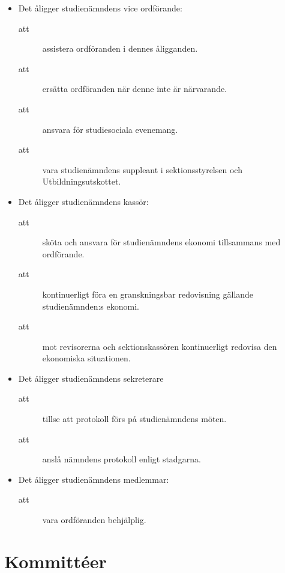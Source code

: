 \documentclass[11pt,a4paper]{article}
\begin{document}
\begin{itemize}
  \item Det åligger studienämndens vice ordförande:
    \begin{description}
      \item[att] assistera ordföranden i dennes åligganden.
      \item[att] ersätta ordföranden när denne inte är närvarande.
      \item[att] ansvara för studiesociala evenemang.
      \item[att] vara studienämndens suppleant i sektionsstyrelsen och Utbildningsutskottet.
    \end{description}

  \item Det åligger studienämndens kassör:
    \begin{description}
      \item[att] sköta och ansvara för studienämndens ekonomi tillsammans med ordförande.
      \item[att] kontinuerligt föra en granskningsbar redovisning gällande studienämnden:s ekonomi.
      \item[att] mot revisorerna och sektionskassören kontinuerligt redovisa den ekonomiska situationen. 
    \end{description}

	\vspace{5mm}
	
    
    \item Det åligger studienämndens sekreterare
     \begin{description}
         \item[att] tillse att protokoll förs på studienämndens möten.
    \item[att] anslå nämndens protokoll enligt stadgarna.
     \end{description}

  \item Det åligger studienämndens medlemmar:
    \begin{description}
      \item[att] vara ordföranden behjälplig.
    \end{description}

\end{itemize}


\newpage

\section{Kommittéer}
\end{document}
